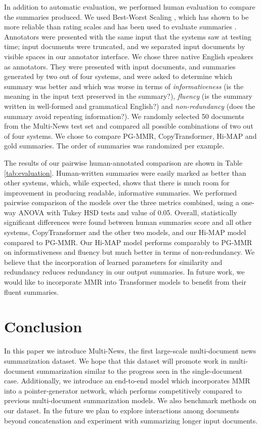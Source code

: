 \documentclass[11pt,a4paper]{article}
\begin{document}
In addition to automatic evaluation, we performed human evaluation to compare the summaries produced. We used Best-Worst Scaling \cite{louvrier1991, louvrier2015}, which has shown to be more reliable than rating scales \cite{kiritchenko17} and has been used to evaluate  summaries \cite{narayan18xsum, angelidis18opinions}. Annotators were presented with the same input that the systems saw at testing time; input documents were truncated, and we separated input documents by visible spaces in our annotator interface. We chose three native English speakers as annotators. They were presented with input documents, and summaries generated by two out of four systems, and were asked to determine which summary was better and which was worse in terms of \textit{informativeness} (is the meaning in the input text preserved in the summary?), \textit{fluency} (is the summary written in well-formed and grammatical English?) and 
\textit{non-redundancy} (does the summary avoid repeating information?). We randomly selected 50 documents from the Multi-News test set and compared all possible combinations of two out of four systems. We chose to compare PG-MMR, CopyTransformer, Hi-MAP and gold summaries. The order of summaries was randomized per example.


The results of our pairwise human-annotated comparison are shown in Table \ref{tab:evaluation}. Human-written summaries were easily marked as better than other systems, which, while expected, shows that there is much room for improvement in producing readable, informative summaries. We performed pairwise comparison of the models over the three metrics combined, using a one-way ANOVA with Tukey HSD tests and  value of 0.05. Overall, statistically significant differences were found between human summaries score and all other systems, CopyTransformer and the other two models, and our Hi-MAP model compared to PG-MMR. Our Hi-MAP model performs comparably to PG-MMR on informativeness and fluency but much better in terms of non-redundancy. We believe that the incorporation of learned parameters for similarity and redundancy reduces redundancy in our output summaries. In future work, we would like to incorporate MMR into Transformer models to benefit from their fluent summaries. 
\section{Conclusion}
\vspace{-2mm}
In this paper we introduce Multi-News, the first large-scale multi-document news summarization dataset. We hope that this dataset will promote work in multi-document summarization similar to the progress seen in the single-document case. Additionally, we introduce an end-to-end model which incorporates MMR into a pointer-generator network, which performs competitively compared to previous multi-document summarization models. We also benchmark methods on our dataset. In the future we plan to explore interactions among documents beyond concatenation and experiment with summarizing longer input documents. 








\end{document}
